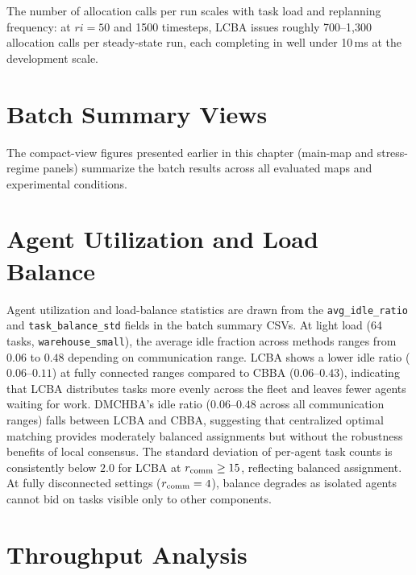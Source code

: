 The number of allocation calls per run scales with task load and
replanning frequency: at $ri = 50$ and 1500 timesteps, LCBA issues
roughly 700--1,300 allocation calls per steady-state run, each completing in
well under 10\,ms at the development scale.


\section{Batch Summary Views}
\label{sec:exp_compact_views}

The compact-view figures presented earlier in this chapter (main-map and
stress-regime panels) summarize the batch results across all evaluated maps
and experimental conditions.


\section{Agent Utilization and Load Balance}
\label{sec:exp_utilisation}

Agent utilization and load-balance statistics are drawn from the
\texttt{avg\_idle\_ratio} and \texttt{task\_balance\_std} fields in the
batch summary CSVs.
At light load (64 tasks, \texttt{warehouse\_small}), the average idle fraction
across methods ranges from $0.06$ to $0.48$ depending on communication range.
LCBA shows a lower idle ratio ($0.06$--$0.11$) at fully connected ranges
compared to CBBA ($0.06$--$0.43$), indicating that LCBA distributes tasks
more evenly across the fleet and leaves fewer agents waiting for work.
DMCHBA's idle ratio ($0.06$--$0.48$ across all communication ranges) falls
between LCBA and CBBA, suggesting that centralized optimal matching provides
moderately balanced assignments but without the robustness benefits of
local consensus.
The standard deviation of per-agent
task counts is consistently below $2.0$ for LCBA at $r_{\text{comm}} \geq 15$,
reflecting balanced assignment.
At fully disconnected settings ($r_{\text{comm}} = 4$), balance degrades as isolated
agents cannot bid on tasks visible only to other components.


\section{Throughput Analysis}
\label{sec:exp_throughput}


